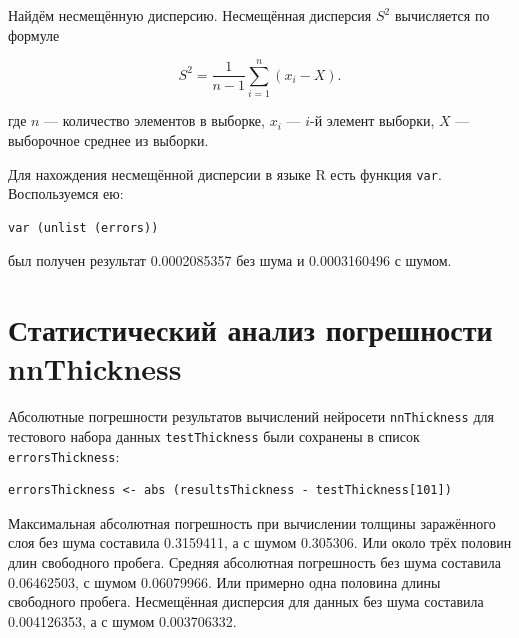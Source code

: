 \documentclass[12pt]{article}
\begin{document}
Найдём несмещённую дисперсию. Несмещённая дисперсия $S^2$ вычисляется по формуле

$$S^2 = \dfrac {1} {n-1} \sum_{i=1}^{n}(x_i - X).$$

где $n$ --- количество элементов в выборке, $x_i$ --- $i$-й элемент выборки, $X$ --- выборочное среднее из выборки.

Для нахождения несмещённой дисперсии в языке R есть функция \verb|var|. Воспользуемся ею:

\begin{verbatim}
var (unlist (errors))
\end{verbatim}

был получен результат 0.0002085357 без шума и 0.0003160496 с шумом.

\section{Статистический анализ погрешности nnThickness}

Абсолютные погрешности результатов вычислений нейросети \verb|nnThickness| для тестового набора данных \verb|testThickness| были сохранены в список \verb|errorsThickness|:

\begin{verbatim}
errorsThickness <- abs (resultsThickness - testThickness[101])
\end{verbatim}

Максимальная абсолютная погрешность при вычислении толщины заражённого слоя без шума составила 0.3159411, а с шумом 0.305306. Или около трёх половин длин свободного пробега. Средняя абсолютная погрешность без шума составила 0.06462503, с шумом 0.06079966. Или примерно одна половина длины свободного пробега. Несмещённая дисперсия для данных без шума составила 0.004126353, а с шумом 0.003706332.
\end{document}
